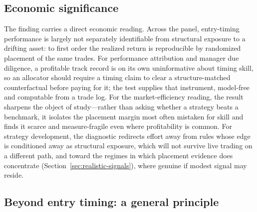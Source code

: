 \subsection{Economic significance}
\label{sec:discussion-economic}

The finding carries a direct economic reading. Across the panel, entry-timing performance
is largely not separately identifiable from structural exposure to a drifting asset: to
first order the realized return is reproducible by randomized placement of the same trades.
For performance attribution and manager due diligence, a profitable track record is on its
own uninformative about timing skill, so an allocator should require a timing claim to
clear a structure-matched counterfactual before paying for it; the test supplies that
instrument, model-free and computable from a trade log. For the market-efficiency reading,
the result sharpens the object of study---rather than asking whether a strategy beats a
benchmark, it isolates the placement margin most often mistaken for skill and finds it
scarce and measure-fragile even where profitability is common. For strategy development, the
diagnostic redirects effort away from rules whose edge is conditioned away as structural
exposure, which will not survive live trading on a different path, and toward the regimes in
which placement evidence does concentrate (Section~\ref{sec:realistic-signals}), where
genuine if modest signal may reside.

\subsection{Beyond entry timing: a general principle}
\label{sec:discussion-general}


